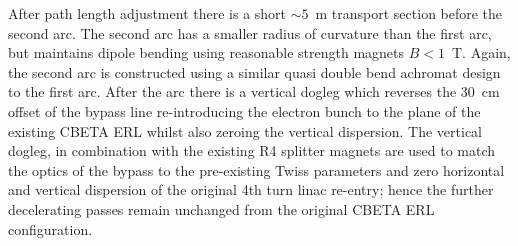\documentclass[../main.tex]{subfiles}
\begin{document}
After path length adjustment there is a short $\sim5$~\si{\metre} transport section before the second arc. The second arc has a smaller radius of curvature than the first arc, but maintains dipole bending using reasonable strength magnets $B < 1$~\si{\tesla}. Again, the second arc is constructed using a similar quasi double bend achromat design to the first arc. After the arc there is a vertical dogleg which reverses the 30~\si{\centi\meter} offset of the bypass line re-introducing the electron bunch to the plane of the existing CBETA ERL whilst also zeroing the vertical dispersion. The vertical dogleg, in combination with the existing R4 splitter magnets are used to match the optics of the bypass to the pre-existing Twiss parameters and zero horizontal and vertical dispersion of the original 4th turn linac re-entry; hence the further decelerating passes remain unchanged from the original CBETA ERL configuration.   
\end{document}
